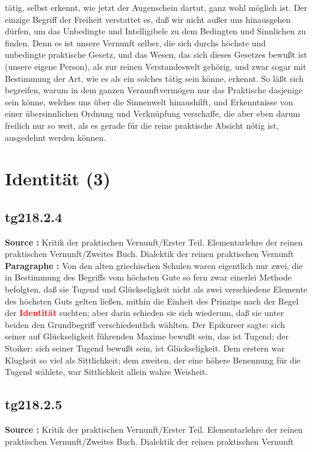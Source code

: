 \documentclass[a4paper,12pt,twoside]{book}
\newcommand{\match}[1]{\textcolor{red}{\textbf{#1}}}
\newcommand{\unnumberedsection}[1]{
	\section*{#1}
	\addcontentsline{toc}{section}{#1}
	\markright{#1}
}
\begin{document}
tätig, selbst erkennt, wie jetzt der Augenschein dartut, ganz wohl möglich ist. Der einzige Begriff der Freiheit verstattet es, daß wir nicht außer uns hinausgehen dürfen, um das Unbedingte und Intelligibele zu dem Bedingten und Sinnlichen zu finden. Denn es ist unsere Vernunft selber, die sich durchs höchste und unbedingte praktische Gesetz, und das Wesen, das sich dieses Gesetzes bewußt ist (unsere eigene Person), als zur reinen Verstandeswelt gehörig, und zwar sogar mit Bestimmung der Art, wie es als ein solches tätig sein könne, erkennt. So läßt sich begreifen, warum in dem ganzen Vernunftvermögen nur das Praktische dasjenige sein könne, welches uns über die Sinnenwelt hinaushilft, und Erkenntnisse von einer übersinnlichen Ordnung und Verknüpfung verschaffe, die aber eben darum freilich nur so weit, als es gerade für die reine praktische Absicht nötig ist, ausgedehnt werden können. 
	
	\unnumberedsection{Identität (3)} 
	\subsection*{tg218.2.4} 
	\textbf{Source : }Kritik der praktischen Vernunft/Erster Teil. Elementarlehre der reinen praktischen Vernunft/Zweites Buch. Dialektik der reinen praktischen Vernunft\\  
	
	\textbf{Paragraphe : }Von den alten griechischen Schulen waren eigentlich nur zwei, die in Bestimmung des Begriffs vom höchsten Gute so fern zwar einerlei Methode befolgten, daß sie Tugend und Glückseligkeit nicht als zwei verschiedene Elemente des höchsten Guts gelten ließen, mithin die Einheit des Prinzips nach der Regel der \match{Identität} suchten; aber darin schieden sie sich wiederum, daß sie unter beiden den Grundbegriff verschiedentlich wählten. Der Epikureer sagte: sich seiner auf Glückseligkeit führenden Maxime bewußt sein, das ist Tugend; der Stoiker: sich seiner Tugend bewußt sein, ist Glückseligkeit. Dem erstern war Klugheit so viel als  Sittlichkeit; dem zweiten, der eine höhere Benennung für die Tugend wählete, war Sittlichkeit allein wahre Weisheit. 
	
	\subsection*{tg218.2.5} 
	\textbf{Source : }Kritik der praktischen Vernunft/Erster Teil. Elementarlehre der reinen praktischen Vernunft/Zweites Buch. Dialektik der reinen praktischen Vernunft\\  
	
\end{document}
